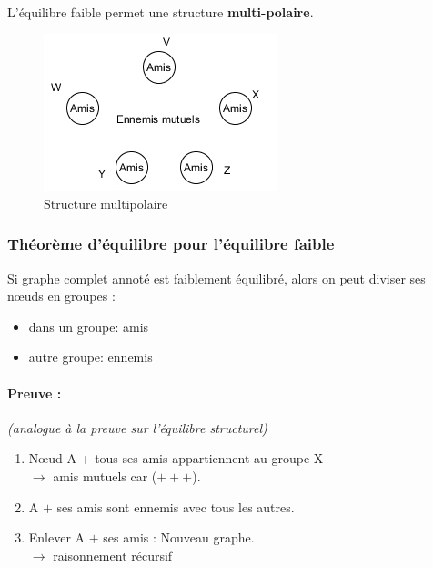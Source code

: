 \paragraph{}
L'équilibre faible permet une structure \textbf{multi-polaire}.

\begin{figure}[h!]
\label{fig:multipolaire}
\caption{Structure multipolaire}
\centering
\includegraphics[scale=1]{images/22_etoile-amis.png}
\end{figure}



\subsubsection*{Théorème d'équilibre pour l'équilibre faible}

Si graphe complet annoté est faiblement équilibré, alors on peut diviser ses nœuds en groupes :

\begin{itemize}


\item dans un groupe: amis

\item autre groupe: ennemis

\end{itemize}

\paragraph{Preuve : } \textit{(analogue à la preuve sur l'équilibre structurel)}


\begin{enumerate}

\item Nœud A + tous ses amis appartiennent au groupe X \\
$\to$ amis mutuels car ($+++$).

\item A $+$ ses amis sont ennemis avec tous les autres.

\item Enlever A $+$ ses amis : Nouveau graphe.\\
$\to$ raisonnement récursif

\end{enumerate}
